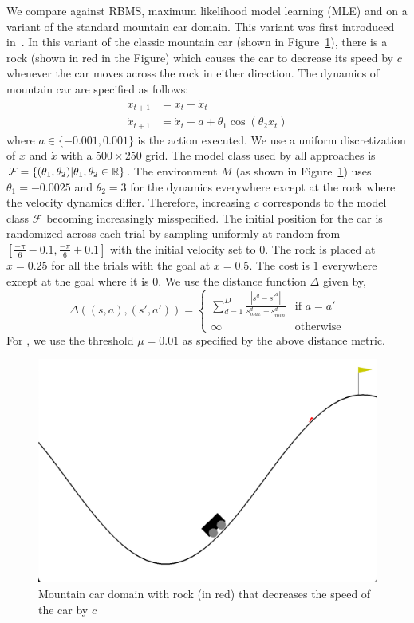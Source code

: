 We compare \taml{} against RBMS, maximum likelihood model learning
(MLE) and \cmax{} on a variant of the standard mountain car
domain. This variant 
was first introduced in~\cite{DBLP:conf/icra/JosephGRHR13}. In this
variant of the classic mountain car (shown in
Figure~\ref{fig:mountaincar}), there is a rock (shown in red in the
Figure) which causes the car to decrease its speed by $c$ whenever the
car moves across the rock in either direction. The dynamics of
mountain car are specified as follows:
\begin{align*}
  x_{t+1} &= x_t + \dot{x}_t \\
  \dot{x}_{t+1} &= \dot{x}_t + a + \theta_1\cos(\theta_2x_t)
\end{align*}
where $a \in \{-0.001, 0.001\}$ is the action executed. We use a
uniform discretization of $x$ and $\dot{x}$ with a $500 \times 250$
grid. The model class used by all approaches is $\mathcal{F} =
\{(\theta_1, \theta_2) | \theta_1, \theta_2 \in \mathbb{R}\}$. The
environment $M$ (as shown in Figure~\ref{fig:mountaincar}) uses
$\theta_1 = -0.0025$ and $\theta_2 = 3$ for the dynamics everywhere
except at the rock where the velocity dynamics differ. Therefore,
increasing $c$ corresponds to the model class $\mathcal{F}$ becoming
increasingly misspecified. The initial position for the car is randomized
across each trial by sampling uniformly at random from
$[\frac{-\pi}{6} - 0.1, \frac{-\pi}{6}+0.1]$ with the initial velocity
set to $0$. The rock is placed at $x = 0.25$ for all the trials with
the goal at $x = 0.5$. The cost is $1$ everywhere except at the goal
where it is $0$. We use the distance function $\Delta$ given by,
\begin{equation}
  \label{eq:24}
  \Delta((s, a), (s', a')) =
  \begin{cases}
    \sum_{d=1}^D \frac{|s^d - s'^d|}{s^d_{max} - s^d_{min}} & \text{if
    } a = a' \\
    \infty & \text{otherwise}
  \end{cases}
\end{equation}
For \taml{}, we use the threshold $\mu = 0.01$ as specified by the
above distance metric.

\begin{figure}[t]
  \centering
  \includegraphics[width=0.5\linewidth]{figures/taml/mountaincar.png}
  \caption{Mountain car domain with rock (in red) that decreases the
    speed of the car by $c$}
  \label{fig:mountaincar}
\end{figure}

